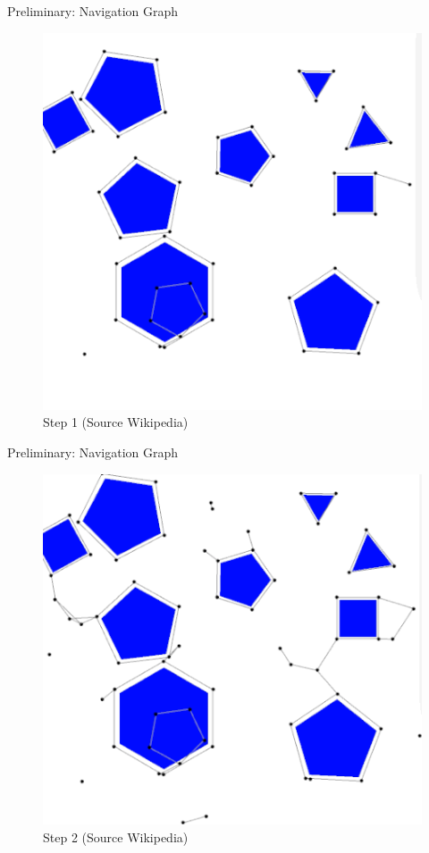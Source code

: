 \documentclass[ignorenonframetext,aspectratio=169,]{paradise-slide}
\begin{document}
\begin{frame}[fragile]{Preliminary: Navigation Graph}
\protect\hypertarget{preliminary-navigation-graph}{}

\begin{figure}
\centering
\includegraphics{PRM-0.png}
\caption{Step 1 (Source Wikipedia)}
\end{figure}

\end{frame}

\begin{frame}[fragile]{Preliminary: Navigation Graph}
\protect\hypertarget{preliminary-navigation-graph-1}{}

\begin{figure}
\centering
\includegraphics{PRM-1.png}
\caption{Step 2 (Source Wikipedia)}
\end{figure}

\addtocounter{framenumber}{-1}

\end{frame}
\end{document}
